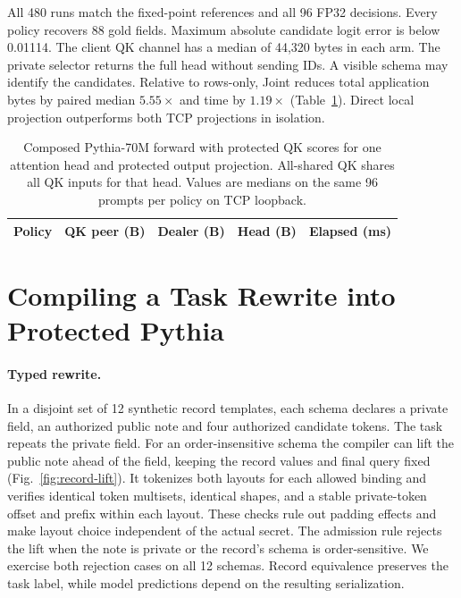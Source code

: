 \documentclass[runningheads]{llncs}
\begin{document}
All 480 runs match the fixed-point references and all 96 FP32 decisions.
Every policy recovers 88 gold fields. Maximum absolute candidate logit
error is below 0.01114. The client QK channel has a median of 44,320
bytes in each arm.
The private selector returns the full head without sending IDs. A
visible schema may identify the candidates. Relative to rows-only,
Joint reduces total application bytes by paired median $5.55\times$
and time by $1.19\times$ (Table~\ref{tab:composed}). Direct local
projection outperforms both TCP projections in isolation.

\begin{table}[t]
\centering
\caption{Composed Pythia-70M forward with protected QK scores for one
attention head and protected output projection. All-shared QK shares
all QK inputs for that head. Values are medians on the same 96 prompts
per policy on TCP loopback.}
\label{tab:composed}
\small\renewcommand{\arraystretch}{1.12}\setlength{\tabcolsep}{5pt}
\begin{tabular}{@{}lrrrr@{}}
\toprule
Policy & QK peer (B) & Dealer (B) & Head (B) & Elapsed (ms)\\
\midrule

\end{tabular}
\end{table}

\section{Compiling a Task Rewrite into Protected Pythia}
\label{sec:compiled}
\paragraph{Typed rewrite.}
In a disjoint set of 12 synthetic record templates, each schema declares a
private field, an authorized public note and four authorized candidate
tokens. The task repeats the private field. For an order-insensitive
schema the compiler can lift the public note ahead of the field, keeping
the record values and final query fixed (Fig.~\ref{fig:record-lift}).
It tokenizes both layouts for each allowed binding and verifies identical
token multisets, identical shapes, and a stable private-token offset and
prefix within each layout. These checks rule out padding effects and
make layout choice independent of the actual secret. The admission
rule rejects the lift when the note is private or the record's
schema is order-sensitive. We exercise both rejection cases on all
12 schemas. Record equivalence preserves the task label, while
model predictions depend on the resulting serialization.
\end{document}
